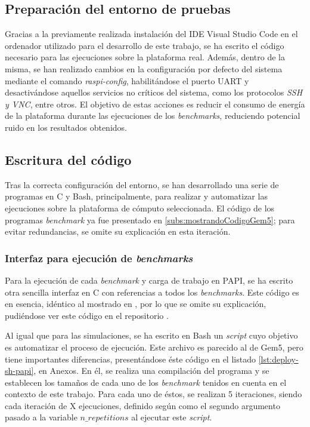 \subsection{Preparación del entorno de pruebas}

Gracias a la previamente realizada instalación del \ac{IDE} Visual Studio Code en el ordenador utilizado para el desarrollo de este trabajo, se ha escrito el código necesario para las ejecuciones sobre la plataforma real. Además, dentro de la misma, se han realizado cambios en la configuración por defecto del sistema mediante el comando \emph{raspi-config}, habilitándose el puerto \ac{UART} y desactivándose aquellos servicios no críticos del sistema, como los protocolos \emph{SSH y VNC}, entre otros. El objetivo de estas acciones es reducir el consumo de energía de la plataforma durante las ejecuciones de los \textit{benchmarks}, reduciendo potencial ruido en los resultados obtenidos. 

\subsection{Escritura del código}

Tras la correcta configuración del entorno, se han desarrollado una serie de programas en C y Bash, principalmente, para realizar y automatizar las ejecuciones sobre la plataforma de cómputo seleccionada. El código de los programas \textit{benchmark} ya fue presentado en \ref{subs:mostrandoCodigoGem5}; para evitar redundancias, se omite su explicación en esta iteración.

\subsubsection{Interfaz para ejecución de \textit{benchmarks}}

Para la ejecución de cada \textit{benchmark} y carga de trabajo en \ac{PAPI}, se ha escrito otra sencilla interfaz en C con referencias a todos los \textit{benchmarks}. Este código es en esencia, idéntico al mostrado en \cite{repoTFM-interfazEjecuciones}, por lo que se omite su explicación, pudiéndose ver este código en el repositorio \cite{repoTFM} \cite{repoTFM-interfazEjecuciones2}. 

Al igual que para las simulaciones, se ha escrito en Bash un \textit{script} cuyo objetivo es automatizar el proceso de ejecución. Este archivo es parecido al de Gem5, pero tiene importantes diferencias, presentándose éste código en el listado \ref{lst:deploy-sh-papi}, en Anexos. En él, se realiza una compilación del programa y se establecen los tamaños de cada uno de los \textit{benchmark} tenidos en cuenta en el contexto de este trabajo. Para cada uno de éstos, se realizan 5 iteraciones, siendo cada iteración de X ejecuciones, definido según como el segundo argumento pasado a la variable $n\_repetitions$ al ejecutar este \textit{script}.

